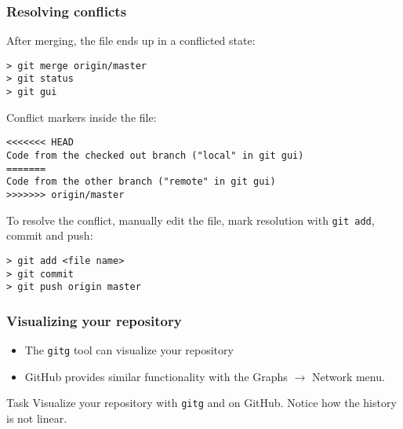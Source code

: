 \begin{frame}[fragile]
	\frametitle{Resolving conflicts}
	
	After merging, the file ends up in a conflicted state:
	\begin{verbatim}
> git merge origin/master
> git status
> git gui
	\end{verbatim}	
	
	Conflict markers inside the file:
	\begin{verbatim}
<<<<<<< HEAD
Code from the checked out branch ("local" in git gui) 
=======
Code from the other branch ("remote" in git gui)
>>>>>>> origin/master
	\end{verbatim}

	To resolve the conflict, manually edit the file, mark resolution with \texttt{git add}, commit and push:
	\begin{verbatim}
> git add <file name>
> git commit
> git push origin master
	\end{verbatim}
	
\end{frame}


\begin{frame}

\frametitle{Visualizing your repository}

\begin{itemize}
	\item The \texttt{gitg} tool can visualize your repository
	\item GitHub provides similar functionality with the Graphs $\rightarrow$ Network menu.
\end{itemize}

\begin{block}{Task}
	Visualize your repository with \texttt{gitg} and on GitHub. Notice how the history is not linear. 
\end{block}

\end{frame}


